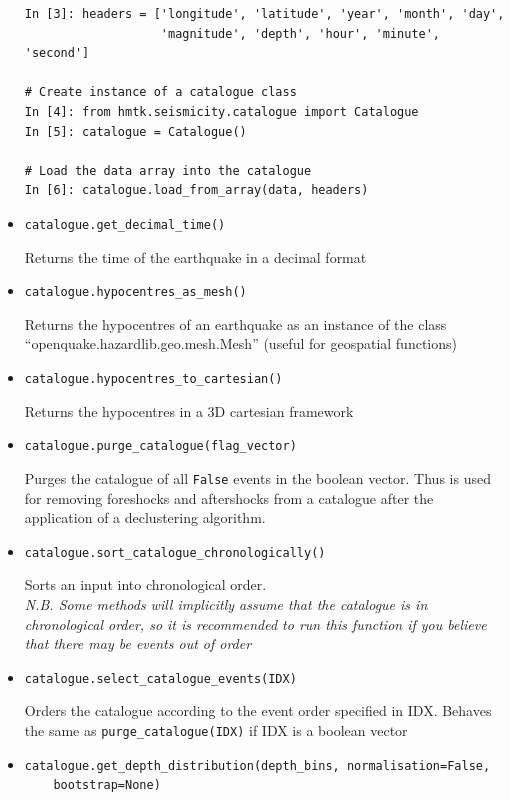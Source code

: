 \begin{itemize}
\begin{Verbatim}[frame=single, commandchars=\\\{\}, fontsize=\scriptsize, samepage=true]
In [3]: headers = ['longitude', 'latitude', 'year', 'month', 'day',
                   'magnitude', 'depth', 'hour', 'minute', 'second']

# Create instance of a catalogue class
In [4]: from hmtk.seismicity.catalogue import Catalogue
In [5]: catalogue = Catalogue()

# Load the data array into the catalogue
In [6]: catalogue.load_from_array(data, headers)

\end{Verbatim}
 

\item \verb=catalogue.get_decimal_time()= 

Returns the time of the earthquake in a decimal format

\item \verb=catalogue.hypocentres_as_mesh()=

Returns the hypocentres of an earthquake as an instance of the class \\ ``openquake.hazardlib.geo.mesh.Mesh'' (useful for geospatial functions)

\item \verb=catalogue.hypocentres_to_cartesian()=

Returns the hypocentres in a 3D cartesian framework

\item \verb=catalogue.purge_catalogue(flag_vector)=

Purges the catalogue of all \verb=False= events in the boolean vector. Thus is used for removing foreshocks and aftershocks from a catalogue after the application of a declustering algorithm.

\item \verb=catalogue.sort_catalogue_chronologically()=

Sorts an input into chronological order. \\
\emph{N.B. Some methods will implicitly assume that the catalogue is in chronological order, so it is recommended to run this function if you believe that there may be events out of order}

\item \verb=catalogue.select_catalogue_events(IDX)=

Orders the catalogue according to the event order specified in IDX. Behaves the same as \verb=purge_catalogue(IDX)= if IDX is a boolean vector

\item \verb;catalogue.get_depth_distribution(depth_bins, normalisation=False,;\\
\verb;    bootstrap=None);


\end{itemize}
